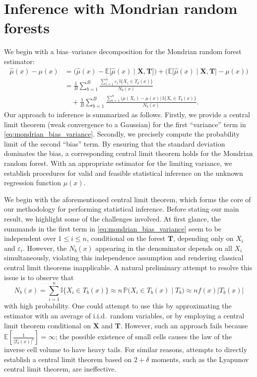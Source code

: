 \documentclass[11pt,lof]{puthesis}
\renewcommand{\P}{\ensuremath{\mathbb{P}}}
\newcommand{\E}{\ensuremath{\mathbb{E}}}
\newcommand{\I}{\ensuremath{\mathbb{I}}}
\newcommand{\bX}{\ensuremath{\mathbf{X}}}
\newcommand{\bT}{\ensuremath{\mathbf{T}}}
\theoremstyle{break}
\theoremstyle{proof}
\begin{document}
\section{Inference with Mondrian random forests}%
\label{sec:mondrian_inference}

We begin with a bias--variance decomposition for the Mondrian random
forest estimator:
%
\begin{align}
  \nonumber
  \hat\mu(x) - \mu(x)
  &=
  \Big( \hat\mu(x) - \E \big[ \hat \mu(x) \mid \bX, \bT \big]\Big)
  + \Big( \E \big[ \hat \mu(x) \mid \bX, \bT \big] - \mu(x)\Big) \\
  &=
  \nonumber
  \frac{1}{B} \sum_{b=1}^B
  \frac{\sum_{i=1}^n \varepsilon_i \, \I\big\{ X_i \in T_b(x) \big\}}
  {N_b(x)} \\
  \label{eq:mondrian_bias_variance}
  &\quad+
  \frac{1}{B} \sum_{b=1}^B
  \frac{\sum_{i=1}^n \big(\mu(X_i) - \mu(x)\big) \,
  \I\big\{ X_i \in T_b(x) \big\}} {N_b(x)}.
\end{align}
%
Our approach to inference is summarized as follows. Firstly, we provide a
central limit theorem (weak convergence to a Gaussian) for the first
``variance'' term in \eqref{eq:mondrian_bias_variance}. Secondly, we precisely
compute the probability limit of the second ``bias'' term. By ensuring that the
standard deviation dominates the bias, a corresponding central limit theorem
holds for the Mondrian random forest. With an appropriate estimator for the
limiting variance, we establish procedures for valid and feasible statistical
inference on the unknown regression function $\mu(x)$.

We begin with the aforementioned central limit theorem, which forms the core of
our methodology for performing statistical inference. Before stating our main
result, we highlight some of the challenges involved. At first glance, the
summands in the first term in \eqref{eq:mondrian_bias_variance} seem to be
independent over $1 \leq i \leq n$, conditional on the forest $\bT$, depending
only on $X_i$ and $\varepsilon_i$. However, the $N_b(x)$ appearing in the
denominator depends on all $X_i$ simultaneously, violating this independence
assumption and rendering classical central limit theorems inapplicable. A
natural preliminary attempt to resolve this issue is to observe that
%
\begin{equation*}
  N_b(x)= \sum_{i=1}^{n} \I\big\{X_i \in T_b(x)\big\}
  \approx n \, \P \big( X_i \in T_b(x) \mid T_b \big)
  \approx n f(x) |T_b(x)|
\end{equation*}
%
with high probability. One could attempt to use this by approximating the
estimator with an average of i.i.d.\ random variables, or by employing a
central limit theorem conditional on $\bX$ and $\bT$. However, such an approach
fails because $\E \left[ \frac{1}{|T_b(x)|^2} \right] = \infty$; the possible
existence of small cells causes the law of the inverse cell volume to have
heavy tails. For similar reasons, attempts to directly establish a central
limit theorem based on $2 + \delta$ moments, such as the Lyapunov central limit
theorem, are ineffective.
\end{document}

